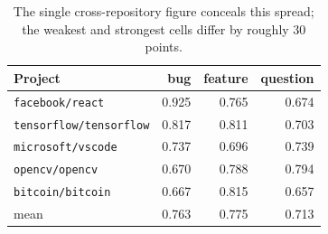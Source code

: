 \begin{table}[htbp]
\centering
\caption{Per-project, per-class F1 of the strongest model (\texttt{linear\_svm}).}
\label{tab:perrepoclass}
\begin{tabular}{lrrr}
\toprule
Project & bug & feature & question \\
\midrule
\texttt{facebook/react} & 0.925 & 0.765 & 0.674 \\
\texttt{tensorflow/tensorflow} & 0.817 & 0.811 & 0.703 \\
\texttt{microsoft/vscode} & 0.737 & 0.696 & 0.739 \\
\texttt{opencv/opencv} & 0.670 & 0.788 & 0.794 \\
\texttt{bitcoin/bitcoin} & 0.667 & 0.815 & 0.657 \\
\midrule
mean & 0.763 & 0.775 & 0.713 \\
\bottomrule
\end{tabular}
\caption*{\footnotesize The single cross-repository figure conceals this spread; the weakest and strongest cells differ by roughly 30 points.}
\end{table}
